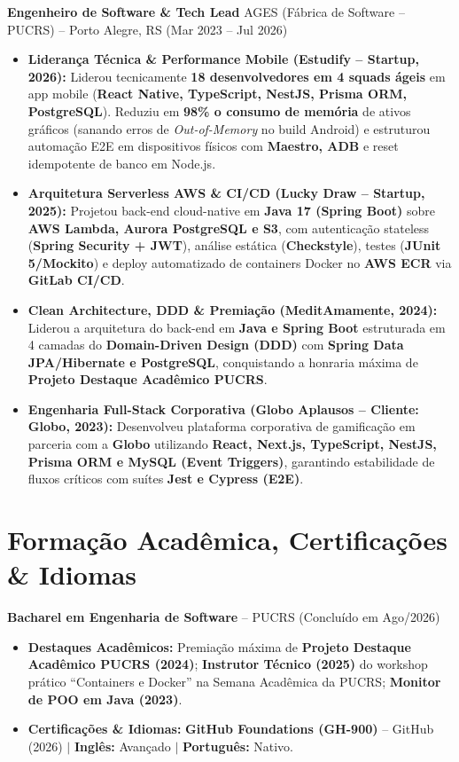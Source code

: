 \documentclass[10pt, letterpaper]{article}
\begin{document}
\vspace{1.5pt}
\textbf{Engenheiro de Software \& Tech Lead} \hfill AGES (F\'abrica de Software -- PUCRS) -- Porto Alegre, RS \hfill (Mar 2023 -- Jul 2026)
\begin{itemize}[itemsep=0.5pt, topsep=1pt, parsep=0pt, leftmargin=10pt]
    \item \textbf{Lideran\c{c}a T\'ecnica \& Performance Mobile (Estudify -- Startup, 2026):} Liderou tecnicamente \textbf{18 desenvolvedores em 4 squads \'ageis} em app mobile (\textbf{React Native, TypeScript, NestJS, Prisma ORM, PostgreSQL}). Reduziu em \textbf{98\% o consumo de mem\'oria} de ativos gr\'aficos (sanando erros de \textit{Out-of-Memory} no build Android) e estruturou automa\c{c}\~ao E2E em dispositivos f\'isicos com \textbf{Maestro, ADB} e reset idempotente de banco em Node.js.
    \item \textbf{Arquitetura Serverless AWS \& CI/CD (Lucky Draw -- Startup, 2025):} Projetou back-end cloud-native em \textbf{Java 17 (Spring Boot)} sobre \textbf{AWS Lambda, Aurora PostgreSQL e S3}, com autentica\c{c}\~ao stateless (\textbf{Spring Security + JWT}), an\'alise est\'atica (\textbf{Checkstyle}), testes (\textbf{JUnit 5/Mockito}) e deploy automatizado de containers Docker no \textbf{AWS ECR} via \textbf{GitLab CI/CD}.
    \item \textbf{Clean Architecture, DDD \& Premia\c{c}\~ao (MeditAmamente, 2024):} Liderou a arquitetura do back-end em \textbf{Java e Spring Boot} estruturada em 4 camadas do \textbf{Domain-Driven Design (DDD)} com \textbf{Spring Data JPA/Hibernate e PostgreSQL}, conquistando a honraria m\'axima de \textbf{Projeto Destaque Acad\^emico PUCRS}.
    \item \textbf{Engenharia Full-Stack Corporativa (Globo Aplausos -- Cliente: Globo\texttrademark, 2023):} Desenvolveu plataforma corporativa de gamifica\c{c}\~ao em parceria com a \textbf{Globo} utilizando \textbf{React, Next.js, TypeScript, NestJS, Prisma ORM e MySQL (Event Triggers)}, garantindo estabilidade de fluxos cr\'iticos com su\'ites \textbf{Jest e Cypress (E2E)}.
\end{itemize}

\section*{Forma\c{c}\~ao Acad\^emica, Certifica\c{c}\~oes \& Idiomas}
\textbf{Bacharel em Engenharia de Software} -- PUCRS \hfill (Conclu\'ido em Ago/2026)
\begin{itemize}[itemsep=0.5pt, topsep=1pt, parsep=0pt, leftmargin=10pt]
    \item \textbf{Destaques Acad\^emicos:} Premia\c{c}\~ao m\'axima de \textbf{Projeto Destaque Acad\^emico PUCRS (2024)}; \textbf{Instrutor T\'ecnico (2025)} do workshop pr\'atico ``Containers e Docker'' na Semana Acad\^emica da PUCRS; \textbf{Monitor de POO em Java (2023)}.
    \item \textbf{Certifica\c{c}\~oes \& Idiomas:} \textbf{GitHub Foundations (GH-900)} -- GitHub (2026) \quad $|$ \quad \textbf{Ingl\^es:} Avan\c{c}ado \quad $|$ \quad \textbf{Portugu\^es:} Nativo.
\end{itemize}
\end{document}
